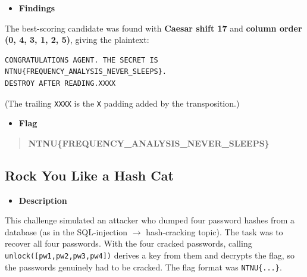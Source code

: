 \documentclass[11pt]{article}
\begin{document}
\begin{itemize}[leftmargin=1.5em]
    \item \textbf{Findings}
\end{itemize}
\noindent The best-scoring candidate was found with \textbf{Caesar shift 17} and \textbf{column order (0, 4, 3, 1, 2, 5)}, giving the plaintext:

\begin{footnotesize}
\begin{verbatim}
CONGRATULATIONS AGENT. THE SECRET IS NTNU{FREQUENCY_ANALYSIS_NEVER_SLEEPS}.
DESTROY AFTER READING.XXXX
\end{verbatim}
\end{footnotesize}

\noindent (The trailing \texttt{XXXX} is the \texttt{X} padding added by the transposition.)

\begin{itemize}[leftmargin=1.5em]
    \item \textbf{Flag}
\end{itemize}
\begin{quote}
\textbf{NTNU\{FREQUENCY\_ANALYSIS\_NEVER\_SLEEPS\}}
\end{quote}

\subsection{Rock You Like a Hash Cat}

\begin{itemize}[leftmargin=1.5em]
    \item \textbf{Description}
\end{itemize}
\noindent This challenge simulated an attacker who dumped four password hashes from a database (as in the SQL-injection $\rightarrow$ hash-cracking topic). The task was to recover all four passwords. With the four cracked passwords, calling \texttt{unlock([pw1,pw2,pw3,pw4])} derives a key from them and decrypts the flag, so the passwords genuinely had to be cracked. The flag format was \texttt{NTNU\{...\}}.
\end{document}
